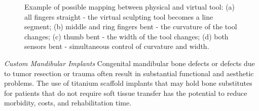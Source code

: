 \begin{enumerate}
{\begin{figure}[!h]
\centering
{}
\caption{\label{fig:haptic2} Example of possible mapping between physical and virtual tool: (a) all fingers straight - the virtual sculpting tool becomes a line segment; (b) middle and ring fingers bent - the curvature of the tool changes; (c) thumb bent - the width of the tool changes; (d) both sensors bent - simultaneous control of curvature and width.} 
\end{figure}
\newpage
\textit{Custom Mandibular Implants} Congenital mandibular bone defects or defects due to tumor resection or trauma often result in substantial functional and aesthetic problems. The use of titanium scaffold implants that may hold bone substitutes for patients that do not require soft tissue transfer has the potential to reduce morbidity, costs, and rehabilitation time.

}
\end{enumerate}
